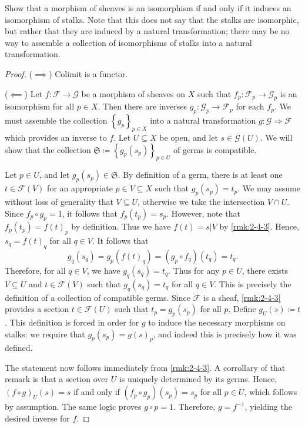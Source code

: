 \begin{exercise}\label{ex:2-4-5}
	Show that a morphism of sheaves is an isomorphism if and only if it induces an isomorphism of stalks. Note that this does not say that the stalks are isomorphic, but rather that they are induced by a natural transformation; there may be no way to assemble a collection of isomorphisms of stalks into a natural transformation.
\end{exercise}
\begin{proof}
	($\implies $) Colimit is a functor.

	($\impliedby $) Let $f : \mathcal{F}  \to \mathcal{G} $ be a morphism of sheaves on $X$ such that $f_p : \mathcal{F} _p \to \mathcal{G} _p$ is an isomorphism for all $p\in X$. Then there are inverses $g_p : \mathcal{G} _p \to \mathcal{F} _p$ for each $f_p$. We must assemble the collection $\left\{ g_p \right\} _{p\in X} $ into a natural transformation $g: \mathcal{G}  \Rightarrow \mathcal{F} $ which provides an inverse to $f$. Let $U\subseteq X$ be open, and let $s\in \mathcal{G} (U)$. We will show that the collection $\mathfrak{S} \coloneqq \left\{ g_p(s_p) \right\} _{p\in U} $ of germs is compatible.

	Let $p\in U$, and let $g_p(s_p)\in \mathfrak{S} $. By definition of a germ, there is at least one $t\in \mathcal{F} (V)$ for an appropriate $p\in V\subseteq X$ such that $g_p(s_p)=t_p$. We may assume without loss of generality that $V\subseteq U$, otherwise we take the intersection $V \cap U$. Since $f_p \circ g_p=1$, it follows that $f_p(t_p) = s_p$. However, note that $f_p(t_p) = f(t)_p$ by definition. Thus we have $f(t)=s|V$ by \cref{rmk:2-4-3}. Hence, $s_q = f(t)_q$ for all $q\in V$. It follows that
	\[
		g_q(s_q) = g_p(f(t)_q) = (g_p \circ f_q)(t_q) = t_q
	.\]
	Therefore, for all $q\in V$, we have $g_q(s_q) = t_q$. Thus for any $p\in U$, there exists $V\subseteq U$ and $t\in \mathcal{F} (V)$ such that $g_q(s_q) = t_q$ for all $q\in V$. This is precisely the definition of a collection of compatible germs. Since $\mathcal{F} $ is a sheaf, \cref{rmk:2-4-3} provides a section $t\in \mathcal{F} (U)$ such that $t_p = g_p(s_p)$ for all $p$. Define $g_U(s)\coloneqq t$. This definition is forced in order for $g$ to induce the necessary morphisms on stalks: we require that $g_p(s_p) = g(s)_p$, and indeed this is precisely how it was defined.

	The statement now follows immediately from \cref{rmk:2-4-3}. A corrollary of that remark is that a section over $U$ is uniquely determined by its germs. Hence, $(f\circ g)_U(s)=s$ if and only if $(f_p \circ g_p)(s_p)=s_p$ for all $p\in U$, which follows by assumption. The same logic proves $g\circ p=1$. Therefore, $g=f^{-1} $, yielding the desired inverse for $f$.
\end{proof}

